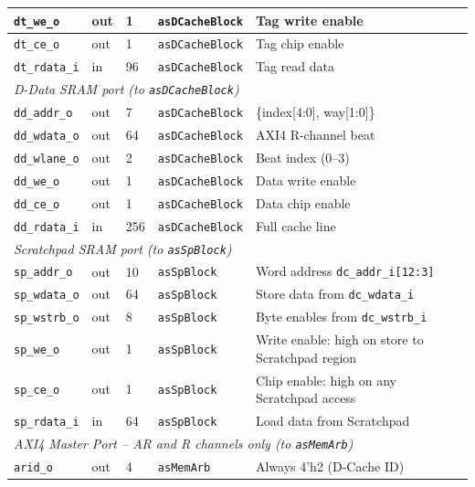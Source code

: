\begin{table}[H]
\begin{tabularx}{\textwidth}{|l |l |l |l |X|}
  \hline
  \texttt{dt\_we\_o}    & out & 1   & \texttt{asDCacheBlock} & Tag write enable \\
  \hline
  \texttt{dt\_ce\_o}    & out & 1   & \texttt{asDCacheBlock} & Tag chip enable \\
  \hline
  \texttt{dt\_rdata\_i} & in  & 96  & \texttt{asDCacheBlock} & Tag read data \\
  \hline
  \multicolumn{5}{|l|}{\textit{D-Data SRAM port (to \texttt{asDCacheBlock})}} \\
  \hline
  \texttt{dd\_addr\_o}  & out & 7   & \texttt{asDCacheBlock} & \{index[4:0], way[1:0]\} \\
  \hline
  \texttt{dd\_wdata\_o} & out & 64  & \texttt{asDCacheBlock} & AXI4 R-channel beat \\
  \hline
  \texttt{dd\_wlane\_o} & out & 2   & \texttt{asDCacheBlock} & Beat index (0--3) \\
  \hline
  \texttt{dd\_we\_o}    & out & 1   & \texttt{asDCacheBlock} & Data write enable \\
  \hline
  \texttt{dd\_ce\_o}    & out & 1   & \texttt{asDCacheBlock} & Data chip enable \\
  \hline
  \texttt{dd\_rdata\_i} & in  & 256 & \texttt{asDCacheBlock} & Full cache line \\
  \hline
  \multicolumn{5}{|l|}{\textit{Scratchpad SRAM port (to \texttt{asSpBlock})}} \\
  \hline
  \texttt{sp\_addr\_o}  & out & 10 & \texttt{asSpBlock} & Word address \texttt{dc\_addr\_i[12:3]} \\
  \hline
  \texttt{sp\_wdata\_o} & out & 64 & \texttt{asSpBlock} & Store data from \texttt{dc\_wdata\_i} \\
  \hline
  \texttt{sp\_wstrb\_o} & out & 8  & \texttt{asSpBlock} & Byte enables from \texttt{dc\_wstrb\_i} \\
  \hline
  \texttt{sp\_we\_o}    & out & 1  & \texttt{asSpBlock} & Write enable: high on store to Scratchpad region \\
  \hline
  \texttt{sp\_ce\_o}    & out & 1  & \texttt{asSpBlock} & Chip enable: high on any Scratchpad access \\
  \hline
  \texttt{sp\_rdata\_i} & in  & 64 & \texttt{asSpBlock} & Load data from Scratchpad \\
  \hline
  \multicolumn{5}{|l|}{\textit{AXI4 Master Port -- AR and R channels only (to \texttt{asMemArb})}} \\
  \hline
  \texttt{arid\_o}    & out & 4  & \texttt{asMemArb} & Always 4'h2 (D-Cache ID) \\

\end{tabularx}
\end{table}
